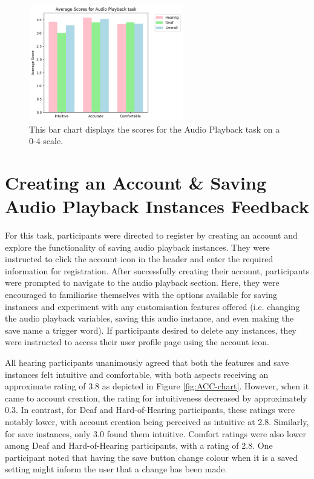 \documentclass{l4proj}
\begin{document}
\begin{figure}
    \centering
    \includegraphics[width=0.6\textwidth]{dissertation/images/PB.png}
    \caption{This bar chart displays the scores for the Audio Playback task on a 0-4 scale.}
    \label{fig:PB-chart}
\end{figure}

\section{Creating an Account \& Saving Audio Playback Instances Feedback}

For this task, participants were directed to register by creating an account and explore the functionality of saving audio playback instances. They were instructed to click the account icon in the header and enter the required information for registration. After successfully creating their account, participants were prompted to navigate to the audio playback section. Here, they were encouraged to familiarise themselves with the options available for saving instances and experiment with any customisation features offered (i.e. changing the audio playback variables, saving this audio instance, and even making the save name a trigger word). If participants desired to delete any instances, they were instructed to access their user profile page using the account icon.

All hearing participants unanimously agreed that both the features and save instances felt intuitive and comfortable, with both aspects receiving an approximate rating of 3.8 as depicted in Figure \ref{fig:ACC-chart}. However, when it came to account creation, the rating for intuitiveness decreased by approximately 0.3. In contrast, for Deaf and Hard-of-Hearing participants, these ratings were notably lower, with account creation being perceived as intuitive at 2.8. Similarly, for save instances, only 3.0 found them intuitive. Comfort ratings were also lower among Deaf and Hard-of-Hearing participants, with a rating of 2.8. One participant noted that having the save button change colour when it is a saved setting might inform the user that a change has been made. 
\end{document}
